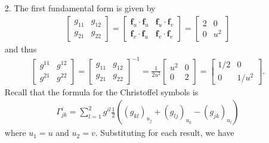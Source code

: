 \documentclass[a4paper,12pt]{article}
\newcommand{\bs}{\boldsymbol}
\theoremstyle{remark}
\begin{document}
\begin{enumerate}
    \item[2.]
        The first fundamental form is given by
        \begin{align*}
            \left[ \begin{array}{cc}
                    g_{11} & g_{12} \\
                    g_{21} & g_{22}
            \end{array} \right]
            = \left[ \begin{array}{cc}
                    \bs{f}_u \cdot \bs{f}_u & \bs{f}_u \cdot \bs{f}_v \\
                    \bs{f}_v \cdot \bs{f}_u & \bs{f}_v \cdot \bs{f}_v
            \end{array} \right]
            = \left[ \begin{array}{cc}
                    2 & 0 \\
                    0 & u^2
            \end{array} \right]
        \end{align*}
        and thus
        \begin{align*}
            \left[ \begin{array}{cc}
                    g^{11} & g^{12} \\
                    g^{21} & g^{22}
            \end{array} \right]
            = \left[ \begin{array}{cc}
                    g_{11} & g_{12} \\
                    g_{21} & g_{22}
            \end{array} \right]^{-1}
            = \frac{1}{2u^2}
            \left[ \begin{array}{cc}
                    u^2 & 0 \\
                    0 & 2
            \end{array} \right]
            = \left[ \begin{array}{cc}
                    1/2 & 0 \\
                    0 & 1/u^2
            \end{array} \right].
        \end{align*}
        Recall that the formula for the Christoffel symbols is
        \begin{align*}
            \Gamma_{jk}^i = \sum_{l = 1}^2 g^{il} \frac{1}{2} \left( (g_{kl})_{u_j} + (g_{lj})_{u_k} - (g_{jk})_{u_l} \right)
        \end{align*}
        where $u_1 = u$ and $u_2 = v$. Substituting for each result, we have

\end{enumerate}
\end{document}
